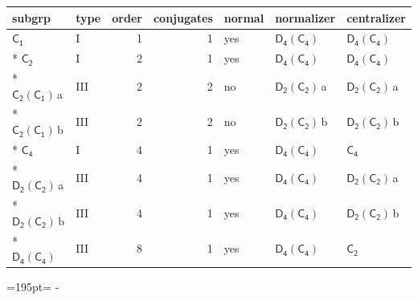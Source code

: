 \documentclass[10pt,a4paper]{article}
\newcommand{\needspace}[1]{\par\penalty-100\begingroup\dimen0=#1\relax\dimen2=\pagegoal
  \advance\dimen2-\pagetotal\ifdim\dimen0>\dimen2\relax\ifdim\dimen2>0pt\vfil\break\fi\fi
  \endgroup}
\numberwithin{equation}{section}
\newcommand{\grp}[1]{\mathsf{#1}}
\newcommand{\clsletter}[1]{\,{\scriptsize\color{black!55}#1}}
\begin{document}
{\small\begin{longtable}{@{}llrrlll@{}}\toprule
subgrp & type & order & conjugates & normal & normalizer & centralizer\\\midrule\endhead
\bottomrule\endfoot\endlastfoot
\href{../../../rotation/data/pdf/C1.pdf}{$\grp{C_{1}}$} & I & 1 & 1 & yes & \href{D4-C4.pdf}{$\grp{D_{4}}(\grp{C_{4}})$} & \href{D4-C4.pdf}{$\grp{D_{4}}(\grp{C_{4}})$}\\*
\href{../../../rotation/data/pdf/C2.pdf}{$\grp{C_{2}}$} & I & 2 & 1 & yes & \href{D4-C4.pdf}{$\grp{D_{4}}(\grp{C_{4}})$} & \href{D4-C4.pdf}{$\grp{D_{4}}(\grp{C_{4}})$}\\*
\href{C2-C1.pdf}{$\grp{C_{2}}(\grp{C_{1}})$}\clsletter{a} & III & 2 & 2 & no & \href{D2-C2.pdf}{$\grp{D_{2}}(\grp{C_{2}})$}\clsletter{a} & \href{D2-C2.pdf}{$\grp{D_{2}}(\grp{C_{2}})$}\clsletter{a}\\*
\href{C2-C1.pdf}{$\grp{C_{2}}(\grp{C_{1}})$}\clsletter{b} & III & 2 & 2 & no & \href{D2-C2.pdf}{$\grp{D_{2}}(\grp{C_{2}})$}\clsletter{b} & \href{D2-C2.pdf}{$\grp{D_{2}}(\grp{C_{2}})$}\clsletter{b}\\*
\href{../../../rotation/data/pdf/C4.pdf}{$\grp{C_{4}}$} & I & 4 & 1 & yes & \href{D4-C4.pdf}{$\grp{D_{4}}(\grp{C_{4}})$} & \href{../../../rotation/data/pdf/C4.pdf}{$\grp{C_{4}}$}\\*
\href{D2-C2.pdf}{$\grp{D_{2}}(\grp{C_{2}})$}\clsletter{a} & III & 4 & 1 & yes & \href{D4-C4.pdf}{$\grp{D_{4}}(\grp{C_{4}})$} & \href{D2-C2.pdf}{$\grp{D_{2}}(\grp{C_{2}})$}\clsletter{a}\\*
\href{D2-C2.pdf}{$\grp{D_{2}}(\grp{C_{2}})$}\clsletter{b} & III & 4 & 1 & yes & \href{D4-C4.pdf}{$\grp{D_{4}}(\grp{C_{4}})$} & \href{D2-C2.pdf}{$\grp{D_{2}}(\grp{C_{2}})$}\clsletter{b}\\*
\href{D4-C4.pdf}{$\grp{D_{4}}(\grp{C_{4}})$} & III & 8 & 1 & yes & \href{D4-C4.pdf}{$\grp{D_{4}}(\grp{C_{4}})$} & \href{../../../rotation/data/pdf/C2.pdf}{$\grp{C_{2}}$}\\
\bottomrule\end{longtable}}
\needspace{195pt}
\end{document}

